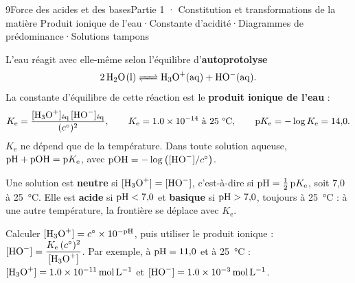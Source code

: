 \begin{ouverture}[forceacide]{9}{Force des acides et des bases}{Partie 1 · Constitution et transformations de la matière}
{Produit ionique de l'eau\enspace·\enspace Constante d'acidité\enspace·\enspace Diagrammes de prédominance\enspace·\enspace Solutions tampons}
\end{ouverture}
\essentiel
{}
\begin{definition}
L'eau réagit avec elle-même selon l'équilibre d'\textbf{autoprotolyse}
\[\ce{2 H2O(l) <=> H3O^+(aq) + HO^-(aq)}.\]
La constante d'équilibre de cette réaction est le \textbf{produit ionique de l'eau} :
\[K_\mathrm{e}=\frac{[\ce{H3O+}]_\text{éq}\,[\ce{HO-}]_\text{éq}}{(\cst)^2},\qquad K_\mathrm{e}=\num{1.0e-14}\ \text{à 25~°C},\qquad
\mathrm{p}K_\mathrm{e}=-\log K_\mathrm{e}=14{,}0.\]
$K_\mathrm{e}$ ne dépend que de la température. Dans toute solution aqueuse, $\mathrm{pH}+\mathrm{pOH}=\mathrm{p}K_\mathrm{e}$, avec
$\mathrm{pOH}=-\log\left([\ce{HO-}]/\cst\right)$.
\end{definition}
\begin{propriete}
Une solution est \textbf{neutre} si $[\ce{H3O+}]=[\ce{HO-}]$, c'est-à-dire si $\mathrm{pH}=\frac12\,\mathrm{p}K_\mathrm{e}$, soit 7,0
à 25~°C. Elle est \textbf{acide} si $\mathrm{pH}<7{,}0$ et \textbf{basique} si $\mathrm{pH}>7{,}0$, toujours à 25~°C : à une autre
température, la frontière se déplace avec $K_\mathrm{e}$.
\end{propriete}
\begin{savoirfaire}
Calculer $[\ce{H3O+}]=\cst\times10^{-\pH}$, puis utiliser le produit ionique :
$[\ce{HO-}]=\dfrac{K_\mathrm{e}\,(\cst)^2}{[\ce{H3O+}]}$. Par exemple, à $\mathrm{pH}=11{,}0$ et à 25~°C :
$[\ce{H3O+}]=\qty{1,0e-11}{mol.L^{-1}}$ et $[\ce{HO-}]=\qty{1,0e-3}{mol.L^{-1}}$.
\end{savoirfaire}
